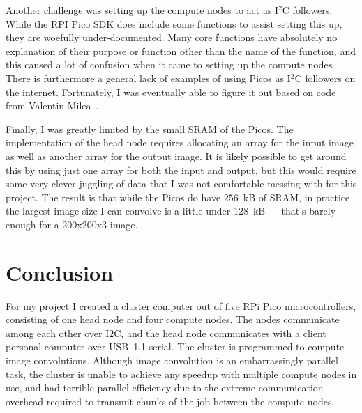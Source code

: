 \documentclass[conference]{IEEEtran}
\begin{document}
Another challenge was setting up the compute nodes to act as I$^2$C followers.
While the RPI Pico SDK does include some functions to assist setting this up, they are woefully under-documented.
Many core functions have absolutely no explanation of their purpose or function other than the name of the function, and this caused a lot of confusion when it came to setting up the compute nodes. 
There is furthermore a general lack of examples of using Picos as I$^2$C followers on the internet.
Fortunately, I was eventually able to figure it out based on code from Valentin Milea~\cite{i2c_slave}.

Finally, I was greatly limited by the small SRAM of the Picos. 
The implementation of the head node requires allocating an array for the input image as well as another array for the output image.
It is likely possible to get around this by using just one array for both the input and output, but this would require some very clever juggling of data that I was not comfortable messing with for this project.
The result is that while the Picos do have $256$~kB of SRAM, in practice the largest image size I can convolve is a little under $128$~kB --- that's barely enough for a 200x200x3 image.

\section{Conclusion}
\label{conclusion_sec}

For my project I created a cluster computer out of five RPi Pico microcontrollers, consisting of one head node and four compute nodes.
The nodes communicate among each other over I$2$C, and the head node communicates with a client personal computer over USB~1.1 serial.
The cluster is programmed to compute image convolutions.
Although image convolution is an embarrassingly parallel task, the cluster is unable to achieve any speedup with multiple compute nodes in use, and had terrible parallel efficiency due to the extreme communication overhead required to transmit chunks of the job between the compute nodes.
\end{document}
